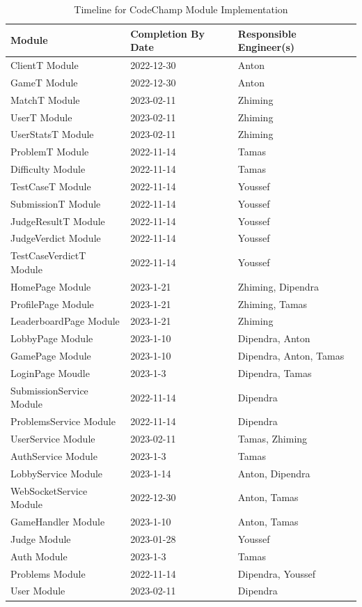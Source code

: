 \documentclass[12pt, titlepage]{article}
\begin{document}
\begin{table}[H]
\centering
\begin{tabular}{p{} p{}  p{}}
\toprule
Module & Completion By Date & Responsible Engineer(s) \\
\midrule
ClientT Module & 2022-12-30 & Anton\\
GameT Module & 2022-12-30 & Anton\\
MatchT Module & 2023-02-11 & Zhiming\\
UserT Module & 2023-02-11 & Zhiming\\
UserStatsT Module & 2023-02-11 & Zhiming\\
ProblemT Module & 2022-11-14 & Tamas\\ 
Difficulty Module & 2022-11-14 & Tamas\\
TestCaseT Module & 2022-11-14 & Youssef\\
SubmissionT Module & 2022-11-14 & Youssef\\
JudgeResultT Module & 2022-11-14 & Youssef\\
JudgeVerdict Module & 2022-11-14 & Youssef\\
TestCaseVerdictT Module & 2022-11-14 & Youssef\\
HomePage Module & 2023-1-21 & Zhiming, Dipendra\\
ProfilePage Module & 2023-1-21 & Zhiming, Tamas\\
LeaderboardPage Module & 2023-1-21 & Zhiming \\
LobbyPage Module & 2023-1-10 & Dipendra, Anton \\
GamePage Module & 2023-1-10 & Dipendra, Anton, Tamas \\
LoginPage Moudle & 2023-1-3 &  Dipendra, Tamas\\
SubmissionService Module & 2022-11-14 & Dipendra\\
ProblemsService Module & 2022-11-14 & Dipendra\\
UserService Module & 2023-02-11 & Tamas, Zhiming\\
AuthService Module & 2023-1-3 & Tamas\\
LobbyService Module & 2023-1-14 & Anton, Dipendra\\
WebSocketService Module & 2022-12-30 & Anton, Tamas \\
GameHandler Module & 2023-1-10 & Anton, Tamas\\
Judge Module & 2023-01-28 & Youssef\\
Auth Module & 2023-1-3 & Tamas\\
Problems Module & 2022-11-14 & Dipendra, Youssef\\
User Module & 2023-02-11 & Dipendra 
\end{tabular}
\caption{Timeline for CodeChamp Module Implementation}
\label{TblMH}
\end{table}
\end{document}
